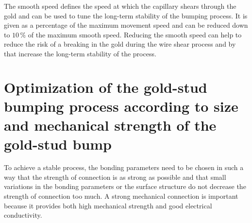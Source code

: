 The smooth speed defines the speed at which the capillary shears through the gold and can be used to tune the long-term stability of the bumping process. It is given as a percentage of the maximum movement speed and can be reduced down to $10\,\%$ of the maximum smooth speed. Reducing the smooth speed can help to reduce the risk of a breaking in the gold during the wire shear process and by that increase the long-term stability of the process.

\section[Optimization of size and mechanical strength of the gold-stud bumps]{Optimization of the gold-stud bumping process according to size and mechanical strength of the gold-stud bump}\label{sec:mechanical_optimization}
To achieve a stable process, the bonding parameters need to be chosen in such a way that the strength of connection is as strong as possible and that small variations in the bonding parameters or the surface structure do not decrease the strength of connection too much. A strong mechanical connection is important because it provides both high mechanical strength and good electrical conductivity.

